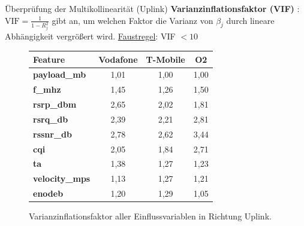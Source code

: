 \begin{frame}{Überprüfung der Multikollinearität (Uplink)}
	\textbf{Varianzinflationsfaktor (VIF)} \cite{fahrmeir_regression}:\\
	$\text{VIF}=\frac{1}{1-R^2_j}$ gibt an, um welchen Faktor die Varianz von $\beta_j$ durch lineare Abhängigkeit vergrößert wird. \underline{Faustregel}: VIF $<10$
	\begin{figure}
		\begin{table}
			\begin{tabular}{l||c|c|c}
				\textbf{Feature} & \textbf{Vodafone} & \textbf{T-Mobile} & \textbf{O2} \\
				\hline\hline
				\textbf{payload\_mb} & 1,01 & 1,00 & 1,00 \\
				\textbf{f\_mhz} & 1,45 & 1,26 & 1,50 \\
				\textbf{rsrp\_dbm} & 2,65 & 2,02 & 1,81 \\
				\textbf{rsrq\_db} & 2,39 & 2,21 & 2,81 \\
				\textbf{rssnr\_db} & 2,78 & 2,62 & 3,44 \\
				\textbf{cqi} & 2,05 & 1,84 & 2,71 \\
				\textbf{ta} & 1,38 & 1,27 & 1,23 \\
				\textbf{velocity\_mps} & 1,13 & 1,27 & 1,21 \\
				\textbf{enodeb} & 1,20 & 1,29 & 1,05 \\
			\end{tabular}%
		\end{table}
		\caption{Varianzinflationsfaktor aller Einflussvariablen in Richtung Uplink.}
	\end{figure}
\end{frame}

